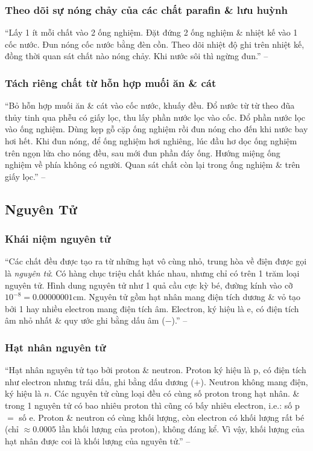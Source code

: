 \documentclass{article}
\numberwithin{equation}{section}
\begin{document}
\subsubsection{Theo dõi sự nóng chảy của các chất parafin \& lưu huỳnh}
``Lấy 1 ít mỗi chất vào 2 ống nghiệm. Đặt đứng 2 ống nghiệm \& nhiệt kế vào 1 cốc nước. Đun nóng cốc nước bằng đèn cồn. Theo dõi nhiệt độ ghi trên nhiệt kế, đồng thời quan sát chất nào nóng chảy. Khi nước sôi thì ngừng đun.'' -- \cite[p. 12]{SGK_Hoa_Hoc_8}

\subsubsection{Tách riêng chất từ hỗn hợp muối ăn \& cát}
``Bỏ hỗn hợp muối ăn \& cát vào cốc nước, khuấy đều. Đổ nước từ từ theo đũa thủy tinh qua phễu có giấy lọc, thu lấy phần nước lọc vào cốc. Đổ phần nước lọc vào ống nghiệm. Dùng kẹp gỗ cặp ống nghiệm rồi đun nóng cho đến khi nước bay hơi hết. Khi đun nóng, để ống nghiệm hơi nghiêng, lúc đầu hơ dọc ống nghiệm trên ngọn lửa cho nóng đều, sau mới đun phần đáy ống. Hướng miệng ống nghiệm về phía không có người. Quan sát chất còn lại trong ống nghiệm \& trên giấy lọc.'' -- \cite[p. 13]{SGK_Hoa_Hoc_8}


\subsection{Nguyên Tử}

\subsubsection{Khái niệm nguyên tử}
``Các chất đều được tạo ra từ những hạt vô cùng nhỏ, trung hòa về điện được gọi là \textit{nguyên tử}. Có hàng chục triệu chất khác nhau, nhưng chỉ có trên 1 trăm loại nguyên tử. Hình dung nguyên tử như 1 quả cầu cực kỳ bé, đường kính vào cỡ $10^{-8} = 0.00000001$cm. Nguyên tử gồm hạt nhân mang điện tích dương \& vỏ tạo bởi 1 hay nhiều electron mang điện tích âm. Electron, ký hiệu là e, có điện tích âm nhỏ nhất \& quy ước ghi bằng dấu âm ($-$).'' -- \cite[p. 14]{SGK_Hoa_Hoc_8}

\subsubsection{Hạt nhân nguyên tử}
``Hạt nhân nguyên tử tạo bởi proton \& neutron. Proton ký hiệu là p, có điện tích như electron nhưng trái dấu, ghi bằng dấu dương ($+$). Neutron không mang điện, ký hiệu là $n$. Các nguyên tử cùng loại đều có cùng số proton trong hạt nhân. \& trong 1 nguyên tử có bao nhiêu proton thì cũng có bấy nhiêu electron, i.e.: số p $=$ số e. Proton \& neutron có cùng khối lượng, còn electron có khối lượng rất bé (chỉ $\approx0.0005$ lần khối lượng của proton), không đáng kể. Vì vậy, khối lượng của hạt nhân được coi là khối lượng của nguyên tử.'' -- \cite[p. 14]{SGK_Hoa_Hoc_8}
\end{document}
